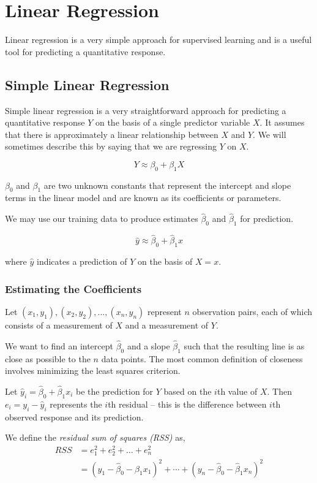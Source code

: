 \documentclass{article}
\begin{document}
\newpage

\section{Linear Regression}
Linear regression is a very simple approach for supervised learning and is a useful tool for predicting a quantitative response.

\subsection{Simple Linear Regression}

Simple linear regression  is a very straightforward approach for predicting a quantitative response $Y$ on the basis of a single predictor variable $X$. It assumes that there is approximately a linear relationship between $X$ and $Y$. We will sometimes describe this by saying that we are regressing $Y$ on $X$.

\[
    Y \approx \beta_0 + \beta_1 X
\]

$\beta_0$ and $\beta_1$ are two unknown constants that represent the intercept and slope terms in the linear model and are known as its coefficients or parameters.


We may use our training data to produce estimates $\hat \beta_0$ and $\hat \beta_1$ for prediction.

\[
    \hat y  \approx \hat \beta_0 + \hat \beta_1 x
\]

where $\hat y$ indicates a prediction of $Y$ on the basis of $X = x$.


\subsubsection{Estimating the Coefficients}
Let $(x_1, y_1), (x_2, y_2),..., (x_n, y_n)$ represent $n$ observation pairs, each of which consists of a measurement of $X$ and a measurement of $Y$.

We want to find an intercept $\hat \beta_0 $ and a slope $\hat \beta_1$ such that the resulting line is as close as possible to the $n$ data points. The most common definition of closeness involves minimizing the least squares criterion.

Let $\hat y_i = \hat \beta_0 + \hat \beta_1 x_i$ be the prediction for $Y$ based on the $i$th value of $X$. Then $e_i = y_i - \hat y_i$ represents the $i$th residual -- this is the difference between $i$th observed response and its prediction. 

We define the \textit{residual sum of squares (RSS)} as,
\begin{align*}
     RSS &= e_1^2 + e_2^2 + \dots + e_n^2\\
     &=  (y_1 - \hat \beta_0 - \hat \beta_1 x_1)^2 + \cdots + 
     (y_n - \hat \beta_0 - \hat \beta_1 x_n)^2
\end{align*}
\end{document}
